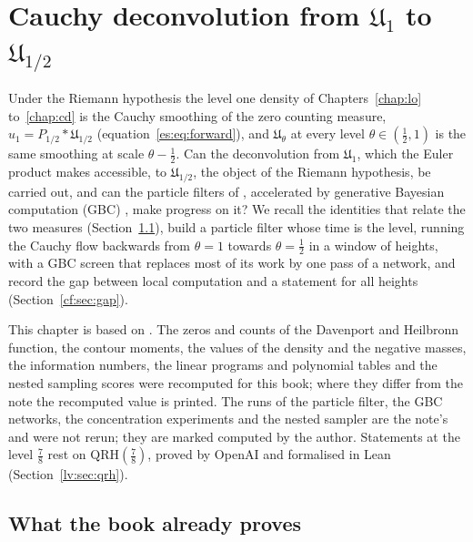 \chapter{Cauchy deconvolution from $\mathfrak U_1$ to $\mathfrak U_{1/2}$}\label{chap:cf}

Under the Riemann hypothesis the level one density of Chapters~\ref{chap:lo} to~\ref{chap:cd} is the Cauchy smoothing of the zero counting measure, $u_1=P_{1/2}*\mathfrak U_{1/2}$ (equation~\eqref{es:eq:forward}), and $\mathfrak U_\theta$ at every level $\theta\in(\frac12,1)$ is the same smoothing at scale $\theta-\frac12$. Can the deconvolution from $\mathfrak U_1$, which the Euler product makes accessible, to $\mathfrak U_{1/2}$, the object of the Riemann hypothesis, be carried out, and can the particle filters of \cite{PSH626}, accelerated by generative Bayesian computation (GBC) \cite{PS23}, make progress on it? We recall the identities that relate the two measures (Section~\ref{cf:sec:recap}), build a particle filter whose time is the level, running the Cauchy flow backwards from $\theta=1$ towards $\theta=\frac12$ in a window of heights, with a GBC screen that replaces most of its work by one pass of a network, and record the gap between local computation and a statement for all heights (Section~\ref{cf:sec:gap}).

This chapter is based on \cite{P26cf}. The zeros and counts of the Davenport and Heilbronn function, the contour moments, the values of the density and the negative masses, the information numbers, the linear programs and polynomial tables and the nested sampling scores were recomputed for this book; where they differ from the note the recomputed value is printed. The runs of the particle filter, the GBC networks, the concentration experiments and the nested sampler are the note's and were not rerun; they are marked computed by the author. Statements at the level $\frac78$ rest on $\mathrm{QRH}(\frac78)$, proved by OpenAI \cite{OAI26a} and formalised in Lean (Section~\ref{lv:sec:qrh}).

\section{What the book already proves}\label{cf:sec:recap}


